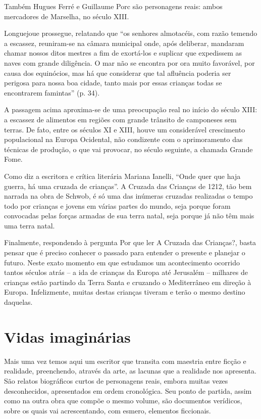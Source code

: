 \documentclass[12pt]{extarticle}
\begin{document}
Também Hugues Ferré e Guillaume Porc são personagens reais: ambos
mercadores de Marselha, no século XIII.

Longuejoue prossegue, relatando que ``os senhores almotacéis, com razão
temendo a escassez, reuniram-se na câmara municipal onde, após
deliberar, mandaram chamar nossos ditos mestres a fim de exortá-los e
suplicar que expedissem as naves com grande diligência. O mar não se
encontra por ora muito favorável, por causa dos equinócios, mas há que
considerar que tal afluência poderia ser perigosa para nossa boa cidade,
tanto mais por essas crianças todas se encontrarem famintas'' (p. 34).

A passagem acima aproxima-se de uma preocupação real no início do século
XIII: a escassez de alimentos em regiões com grande trânsito de
camponeses sem terras. De fato, entre os séculos XI e XIII, houve um
considerável crescimento populacional na Europa Ocidental, não
condizente com o aprimoramento das técnicas de produção, o que vai
provocar, no século seguinte, a chamada Grande Fome.

Como diz a escritora e crítica literária Mariana Ianelli, ``Onde quer
que haja guerra, há uma cruzada de crianças''. A Cruzada das Crianças
de 1212, tão bem narrada na obra de Schwob, é só uma das inúmeras
cruzadas realizadas o tempo todo por crianças e jovens em várias partes
do mundo, seja porque foram convocadas pelas forças armadas de sua terra
natal, seja porque já não têm mais uma terra natal.

Finalmente, respondendo à pergunta Por que ler A Cruzada das Crianças?,
basta pensar que é preciso conhecer o passado para entender o presente e
planejar o futuro. Neste exato momento em que estudamos um acontecimento
ocorrido tantos séculos atrás -- a ida de crianças da Europa até
Jerusalém -- milhares de crianças estão partindo da Terra Santa e
cruzando o Mediterrâneo em direção à Europa. Infelizmente, muitas destas
crianças tiveram e terão o mesmo destino daquelas.

\section{Vidas imaginárias}

Mais uma vez temos aqui um escritor que transita com maestria entre
ficção e realidade, preenchendo, através da arte, as lacunas que a
realidade nos apresenta. São relatos biográficos curtos de personagens
reais, embora muitas vezes desconhecidos, apresentados em ordem
cronológica. Seu ponto de partida, assim como na outra obra que compõe o
mesmo volume, são documentos verídicos, sobre os quais vai
acrescentando, com esmero, elementos ficcionais.
\end{document}
